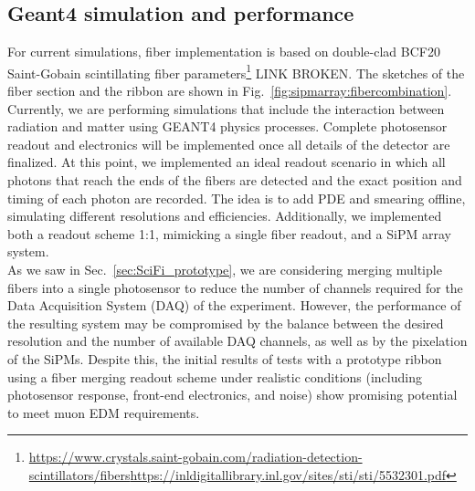 \begin{refsection}
    \subsection{Geant4 simulation and performance}
    \label{sec:muEDM:fiber:g4}
        For current simulations, fiber implementation is based on double-clad BCF20 Saint-Gobain scintillating fiber parameters\footnote{\url{https://www.crystals.saint-gobain.com/radiation-detection-scintillators/fibers}\url{https://inldigitallibrary.inl.gov/sites/sti/sti/5532301.pdf}} LINK BROKEN.
        The sketches of the fiber section and the ribbon are shown in Fig.~\ref{fig:sipmarray:fibercombination}.
        Currently, we are performing simulations that include the interaction between radiation and matter using \textsc{GEANT4} physics processes. 
        Complete photosensor readout and electronics will be implemented once all details of the detector are finalized. 
        At this point, we implemented an ideal readout scenario in which all photons that reach the ends of the fibers are detected and the exact position and timing of each photon are recorded. 
        The idea is to add PDE and smearing offline, simulating different resolutions and efficiencies.
        Additionally, we implemented both a readout scheme 1:1, mimicking a single fiber readout, and a SiPM array system.\\

        \noindent
        As we saw in Sec.~\ref{sec:SciFi_prototype}, we are considering merging multiple fibers into a single photosensor to reduce the number of channels required for the Data Acquisition System (DAQ) of the experiment. 
        However, the performance of the resulting system may be compromised by the balance between the desired resolution and the number of available DAQ channels, as well as by the pixelation of the SiPMs. 
        Despite this, the initial results of tests with a prototype ribbon using a fiber merging readout scheme under realistic conditions (including photosensor response, front-end electronics, and noise) show promising potential to meet muon EDM requirements.


\end{refsection}
